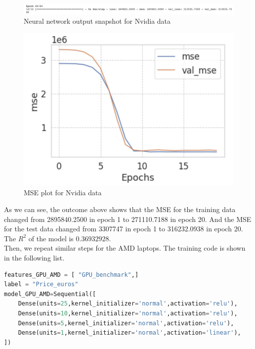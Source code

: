 \documentclass{scrartcl}
\begin{document}
\begin{figure}
         \centering
         \includegraphics[width=\textwidth]{Graphics/Neural Network Images/NN13.png}
         \caption{Neural network output snapshot for Nvidia data}
         \label{fig:NN12-13}
\end{figure}

\begin{figure}[H]
	\begin{center}
		\includegraphics[scale=1.0]{Graphics/Neural Network Images/NN11.png}
    \caption{MSE plot for Nvidia data}
	\end{center}
	\label{fig:net2}
\end{figure}

\noindent As we can see, the outcome above shows that the MSE for the training data changed from 2895840.2500 in epoch 1 to 271110.7188 in epoch 20. And the MSE for the test data changed from 3307747 in epoch 1 to 316232.0938 in epoch 20. The $R^2$ of the model is $0.36932928$.\\





\noindent Then, we repeat similar steps for the AMD laptops. The training code is shown in the following list. 

\begin{lstlisting}[language=Python, caption= Code for training AMD data, basicstyle=\tiny,captionpos=b]
features_GPU_AMD = [ "GPU_benchmark",]
label = "Price_euros"
model_GPU_AMD=Sequential([
    Dense(units=25,kernel_initializer='normal',activation='relu'),
    Dense(units=10,kernel_initializer='normal',activation='relu'),
    Dense(units=5,kernel_initializer='normal',activation='relu'),
    Dense(units=1,kernel_initializer='normal',activation='linear'),
])
\end{lstlisting}
\end{document}
